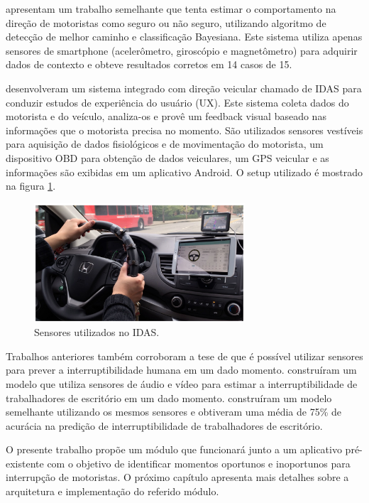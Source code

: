  apresentam um trabalho semelhante que tenta estimar o comportamento na direção de motoristas como seguro ou
não seguro, utilizando algoritmo de detecção de melhor caminho e classificação Bayesiana. Este sistema utiliza
apenas sensores de smartphone (acelerômetro, giroscópio e magnetômetro) para adquirir dados de contexto e obteve
resultados corretos em 14 casos de 15.

 desenvolveram um sistema integrado com direção veicular chamado de IDAS para conduzir estudos de experiência
do usuário (UX). Este sistema coleta dados do motorista e do veículo, analiza-os e provê um feedback visual baseado
nas informações que o motorista precisa no momento. São utilizados sensores vestíveis para aquisição de dados
fisiológicos e de movimentação do motorista, um dispositivo OBD para obtenção de dados veiculares, um GPS veicular e as informações
são exibidas em um aplicativo Android. O setup utilizado é mostrado na figura \ref{idas}.

\begin{figure}[htb]
\centering
\includegraphics[width=0.7\textwidth]{images/idas.png}
\caption{Sensores utilizados no IDAS. \cite{park2016integrated}}
\label{idas}
\end{figure}

Trabalhos anteriores também corroboram a tese de que é possível utilizar sensores para prever a interruptibilidade
humana em um dado momento.  construíram um modelo que utiliza sensores de áudio e vídeo
para estimar a interruptibilidade de trabalhadores de escritório em um dado momento. 
construíram um modelo semelhante utilizando os mesmos sensores e obtiveram uma média de 75\% de acurácia na predição de
interruptibilidade de trabalhadores de escritório.

O presente trabalho propõe um módulo que funcionará junto a um aplicativo pré-existente com o objetivo de identificar momentos
oportunos e inoportunos para interrupção de motoristas. O próximo capítulo apresenta mais detalhes sobre a arquitetura e
implementação do referido módulo.

